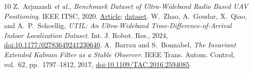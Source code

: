 \documentclass[conference,letterpaper,10pt]{IEEEtran}
\begin{document}
\begin{thebibliography}{10}
 Z.~Arjmandi \emph{et al.}, \emph{Benchmark Dataset of Ultra-Wideband Radio Based UAV Positioning}. IEEE ITSC, 2020. \href{https://doi.org/10.1109/ITSC45102.2020.9294440}{Article}; \href{https://benchmark.qdrone.ausmlab.com/datasets/}{dataset}.
 W.~Zhao, A.~Goudar, X.~Qiao, and A.~P.~Schoellig, \emph{UTIL: An Ultra-Wideband Time-Difference-of-Arrival Indoor Localization Dataset}. Int. J. Robot. Res., 2024, \href{https://doi.org/10.1177/02783649241230640}{doi:10.1177/02783649241230640}.
 A.~Barrau and S.~Bonnabel, \emph{The Invariant Extended Kalman Filter as a Stable Observer}. IEEE Trans. Autom. Control, vol.~62, pp.~1797--1812, 2017, \href{https://doi.org/10.1109/TAC.2016.2594085}{doi:10.1109/TAC.2016.2594085}.
\end{thebibliography}
\end{document}
